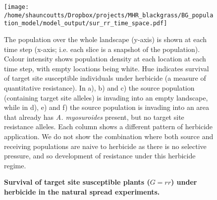 \documentclass[12pt,a4paper]{article}
\begin{document}
\begin{figure}[!h] 
	\texttt{[image: /home/shauncoutts/Dropbox/projects/MHR\_blackgrass/BG\_population\_model/model\_output/sur\_rr\_time\_space.pdf]}
\caption{\bf Survival of target site susceptible plants ($G = rr$) under herbicide in the natural spread experiments.} The population over the whole landscape (y-axis) is shown at each time step (x-axis; i.e. each slice is a snapshot of the population). Colour intensity shows population density at each location at each time step, with empty locations being white. Hue indicates survival of target site susceptible individuals under herbicide (a measure of quantitative resistance). In a), b) and c) the source population (containing target site alleles) is invading into an empty landscape, while in d), e) and f) the source population is invading into an area that already has \textit{A. myosuroides} present, but no target site resistance alleles. Each column shows a different pattern of herbicide application. We do not show the combination where both source and receiving populations are naive to herbicide as there is no selective pressure, and so development of resistance under this herbicide regime.    
\end{figure}
\end{document}
